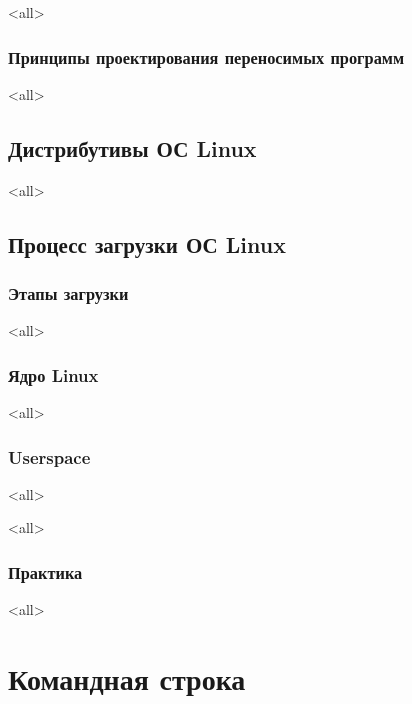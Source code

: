 \mode<all>{}

\subsection{Принципы проектирования переносимых программ}

\mode<all>{}

\section{Дистрибутивы ОС Linux}

\mode<all>{}

\section{Процесс загрузки ОС Linux}

\subsection{Этапы загрузки}

\mode<all>{}

\subsection{Ядро Linux}

\mode<all>{}

\subsection{Userspace}

\mode<all>{}

\mode<all>{}

\subsection{Практика}

\mode<all>{}




\chapter{Командная строка}

